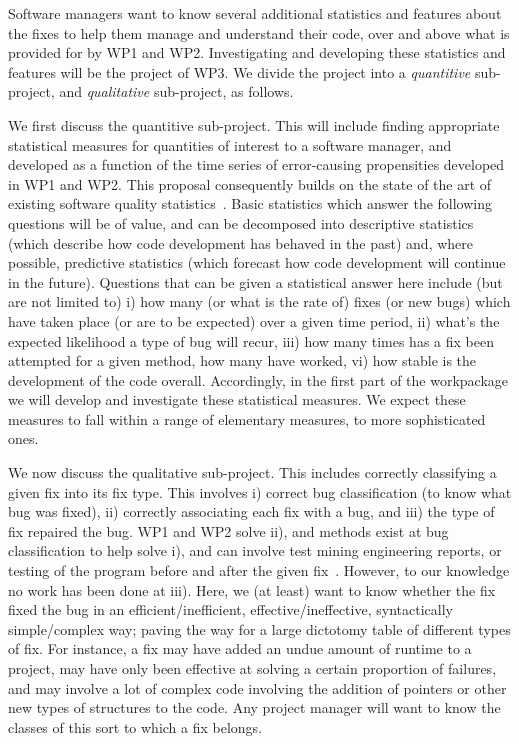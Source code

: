 
Software managers want to know several additional statistics and features about the fixes to help them manage and understand their code, over and above what is provided for by WP1 and WP2. Investigating and developing these statistics and features will be the project of WP3. We divide the project into a \textit{quantitive} sub-project, and \textit{qualitative} sub-project, as follows.

We first discuss the quantitive sub-project. This will include finding appropriate statistical measures for quantities of interest to a software manager, and developed as a function of the time series of error-causing propensities developed in WP1 and WP2. This proposal consequently builds on the state of the art of existing software quality statistics~\cite{gomez2008improving}. Basic statistics which answer the following questions will be of value, and can be decomposed into descriptive statistics (which describe how code development has behaved in the past) and, where possible, predictive statistics (which forecast how code development will continue in the future). Questions that can be given a statistical answer here include (but are not limited to) i) how many (or what is the rate of) fixes (or new bugs) which have taken place (or are to be expected) over a given time period, ii) what's the expected likelihood a type of bug will recur, iii) how many times has a fix been attempted for a given method, how many have worked, vi) how stable is the development of the code overall. Accordingly, in the first part of the workpackage we will develop and investigate these statistical measures. We expect these measures to fall within a range of elementary measures, to more sophisticated ones.  

We now discuss the qualitative sub-project. 
This includes correctly classifying a given fix into its fix type. This involves i) correct bug classification (to know what bug was fixed), ii) correctly associating each fix with a bug, and iii) the type of fix repaired the bug.
WP1 and WP2 solve ii), and methods exist at bug classification to help solve i), and can involve test mining engineering reports, or testing of the program before and after the given fix~\cite{6245635}. However, to our knowledge no work has been done at iii). Here, we (at least) want to know whether the fix fixed the bug in an efficient/inefficient, effective/ineffective, syntactically simple/complex way; paving the way for a large dictotomy table of different types of fix. For instance, a fix may have added an undue amount of runtime to a project, may have only been effective at solving a certain proportion of failures, and may involve a lot of complex code involving the addition of pointers or other new types of structures to the code. Any project manager will want to know the classes of this sort to which a fix belongs.  

